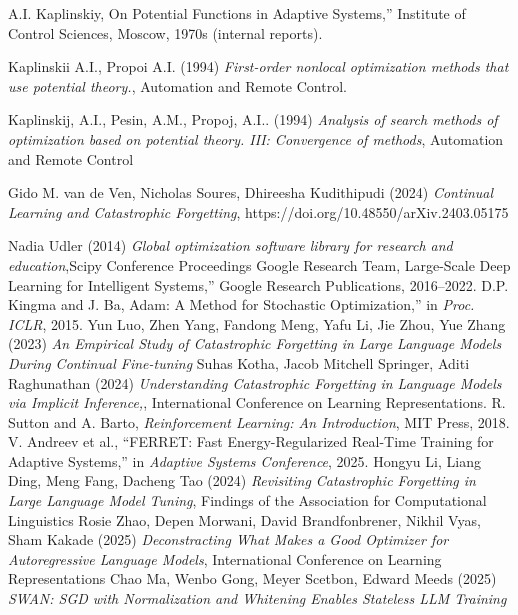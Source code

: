 \documentclass[12pt]{article}
\begin{document}
 \begin{thebibliography}{9}

 A.I. Kaplinskiy, On Potential Functions in Adaptive Systems,'' Institute of Control Sciences, Moscow, 1970s (internal reports).


Kaplinskii A.I., Propoi A.I. (1994) \emph{First-order nonlocal optimization methods that use potential theory.}, Automation and Remote Control. 

Kaplinskij, A.I., Pesin, A.M., Propoj, A.I.. (1994) \emph{  Analysis of search methods of optimization based on potential theory. III: Convergence of methods}, Automation and Remote Control

Gido M. van de Ven, Nicholas Soures, Dhireesha Kudithipudi (2024)  \emph{  Continual Learning and Catastrophic Forgetting},
https://doi.org/10.48550/arXiv.2403.05175

Nadia Udler (2014) \emph{ Global optimization software library for research and education},Scipy Conference Proceedings
 Google Research Team, Large-Scale Deep Learning for Intelligent Systems,'' Google Research Publications, 2016--2022.
 D.P. Kingma and J. Ba, Adam: A Method for Stochastic Optimization,'' in \emph{Proc. ICLR}, 2015.
 Yun Luo, Zhen Yang, Fandong Meng, Yafu Li, Jie Zhou, Yue Zhang (2023) \emph{An Empirical Study of Catastrophic Forgetting in Large Language Models During Continual Fine-tuning}
  Suhas Kotha, Jacob Mitchell Springer, Aditi Raghunathan (2024) \emph{Understanding Catastrophic Forgetting in Language Models via Implicit Inference,},  International Conference on Learning Representations.
 R. Sutton and A. Barto, \emph{Reinforcement Learning: An Introduction}, MIT Press, 2018.
 V. Andreev et al., ``FERRET: Fast Energy-Regularized Real-Time Training for Adaptive Systems,'' in \emph{Adaptive Systems Conference}, 2025.
 Hongyu Li, Liang Ding, Meng Fang, Dacheng Tao  (2024)  \emph{ Revisiting Catastrophic Forgetting in Large Language Model Tuning}, Findings of the Association for Computational Linguistics
 Rosie Zhao, Depen Morwani, David Brandfonbrener, Nikhil Vyas, Sham Kakade (2025) \emph{Deconstracting What Makes a Good Optimizer for Autoregressive Language Models}, International Conference on Learning Representations
 Chao Ma, Wenbo Gong, Meyer Scetbon, Edward Meeds (2025) \emph{SWAN: SGD with Normalization and Whitening Enables Stateless LLM Training}

\end{thebibliography}
\end{document}
